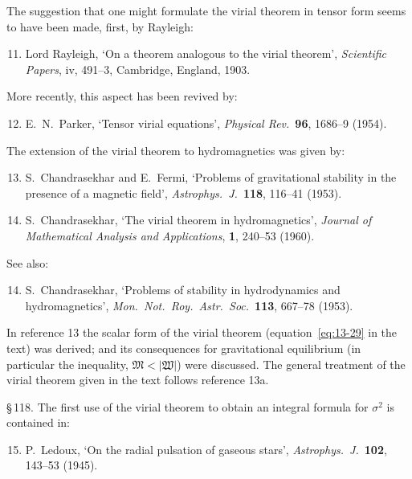 The suggestion that one might formulate the virial theorem in tensor form seems to have been made, first, by Rayleigh:

\begin{enumerate}
\setcounter{enumi}{10}
\item Lord Rayleigh, `On a theorem analogous to the virial theorem', \textit{Scientific Papers}, iv, 491--3, Cambridge, England, 1903.
\end{enumerate}

More recently, this aspect has been revived by:

\begin{enumerate}
\setcounter{enumi}{11}
\item E.\ N.\ Parker, `Tensor virial equations', \textit{Physical Rev.}\ \textbf{96}, 1686--9 (1954).
\end{enumerate}

The extension of the virial theorem to hydromagnetics was given by:

\begin{enumerate}
\setcounter{enumi}{12}
\item S.\ Chandrasekhar and E.\ Fermi, `Problems of gravitational stability in the presence of a magnetic field', \textit{Astrophys.\ J.}\ \textbf{118}, 116--41 (1953).

\item[13a.] S.\ Chandrasekhar, `The virial theorem in hydromagnetics', \textit{Journal of Mathematical Analysis and Applications}, \textbf{1}, 240--53 (1960).
\end{enumerate}

See also:

\begin{enumerate}
\setcounter{enumi}{13}
\item S.\ Chandrasekhar, `Problems of stability in hydrodynamics and hydromagnetics', \textit{Mon.\ Not.\ Roy.\ Astr.\ Soc.}\ \textbf{113}, 667--78 (1953).
\end{enumerate}

In reference 13 the scalar form of the virial theorem (equation~\eqref{eq:13-29} in the text) was derived; and its consequences for gravitational equilibrium (in particular the inequality, $\mathfrak{M} < |\mathfrak{W}|$) were discussed. The general treatment of the virial theorem given in the text follows reference 13a.

\S\,118. The first use of the virial theorem to obtain an integral formula for $\sigma^2$ is contained in:

\begin{enumerate}
\setcounter{enumi}{14}
\item P.\ Ledoux, `On the radial pulsation of gaseous stars', \textit{Astrophys.\ J.}\ \textbf{102}, 143--53 (1945).
\end{enumerate}

